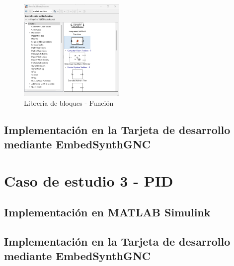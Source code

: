 \begin{figure}[h!]
    \centering
    \includegraphics[width=0.45\textwidth]{fig/Capitulo5/Caso_de_estudio_IMU/Generador_de_salidas/libreria_bloque_de_funcion.png}
    \caption{Librería de bloques - Función}
    \label{fig:lib_bloques_func}
\end{figure}

\subsection{Implementación en la Tarjeta de desarrollo mediante EmbedSynthGNC}

\section{Caso de estudio 3 - PID}
\subsection{Implementación en MATLAB Simulink}
\subsection{Implementación en la Tarjeta de desarrollo mediante EmbedSynthGNC}